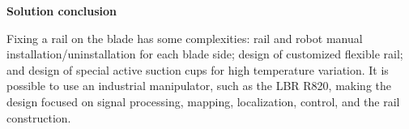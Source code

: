 



\textbf{Solution conclusion}

Fixing a rail on the blade has some complexities: rail and robot manual
installation/uninstallation for each blade side; design of customized flexible
rail; and design of special active suction cups for high temperature
variation. It is possible to use an industrial manipulator, such as the
LBR R820, making the design focused on signal processing,
mapping, localization, control, and the rail construction. 

